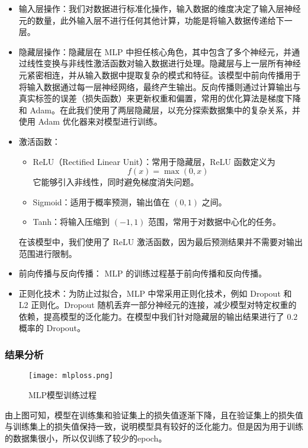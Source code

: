 \documentclass[bwprint]{gmcmthesis}
\begin{document}
\begin{itemize}
    \item 输入层操作：我们对数据进行标准化操作，输入数据的维度决定了输入层神经元的数量，此外输入层不进行任何其他计算，功能是将输入数据传递给下一层。
    \item 隐藏层操作：隐藏层在 MLP 中担任核心角色，其中包含了多个神经元，并通过线性变换与非线性激活函数对输入数据进行处理。隐藏层与上一层所有神经元紧密相连，并从输入数据中提取复杂的模式和特征。该模型中前向传播用于将输入数据通过每一层神经网络，最终产生输出。反向传播则通过计算输出与真实标签的误差（损失函数）来更新权重和偏置，常用的优化算法是梯度下降和 Adam。在此我们使用了两层隐藏层，以充分探索数据集中的复杂关系，并使用 Adam 优化器来对模型进行训练。
    \item 激活函数：
    \begin{itemize}
        \item ReLU（Rectified Linear Unit）：常用于隐藏层，ReLU 函数定义为 
        \[
        f(x) = \max(0, x)
        \]
        它能够引入非线性，同时避免梯度消失问题。
        \item Sigmoid：适用于概率预测，输出值在 $(0, 1)$ 之间。
        \item Tanh：将输入压缩到 $(-1, 1)$ 范围，常用于对数据中心化的任务。
    \end{itemize}
    在该模型中，我们使用了 ReLU 激活函数，因为最后预测结果并不需要对输出范围进行限制。
    \item 前向传播与反向传播： MLP 的训练过程基于前向传播和反向传播。
    \item 正则化技术：为防止过拟合，MLP 中常采用正则化技术，例如 Dropout 和 L2 正则化。Dropout 随机丢弃一部分神经元的连接，减少模型对特定权重的依赖，提高模型的泛化能力。在模型中我们针对隐藏层的输出结果进行了 $0.2$ 概率的 Dropout。
\end{itemize}

\subsubsection{结果分析}

\begin{figure}[!htbp]
    \centering
    \texttt{[image: mlploss.png]}
    \caption{\centering MLP模型训练过程}
    \label{pho:mlploss}
\end{figure}

由上图可知，模型在训练集和验证集上的损失值逐渐下降，且在验证集上的损失值与训练集上的损失值保持一致，说明模型具有较好的泛化能力。但是因为用于训练的数据集很小，所以仅训练了较少的epoch。
\end{document}
